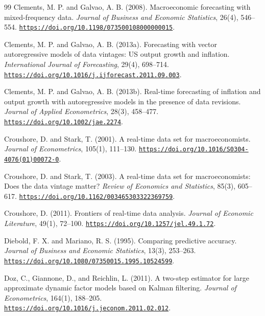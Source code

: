 \documentclass[12pt]{article}
\begin{document}
\begin{thebibliography}{99}
Clements, M. P. and Galvao, A. B. (2008).
Macroeconomic forecasting with mixed-frequency data.
\emph{Journal of Business and Economic Statistics}, 26(4), 546--554. \href{https://doi.org/10.1198/073500108000000015}{\nolinkurl{https://doi.org/10.1198/073500108000000015}}.

Clements, M. P. and Galvao, A. B. (2013a).
Forecasting with vector autoregressive models of data vintages: US output growth and inflation.
\emph{International Journal of Forecasting}, 29(4), 698--714. \href{https://doi.org/10.1016/j.ijforecast.2011.09.003}{\nolinkurl{https://doi.org/10.1016/j.ijforecast.2011.09.003}}.

Clements, M. P. and Galvao, A. B. (2013b).
Real-time forecasting of inflation and output growth with autoregressive models in the presence of data revisions.
\emph{Journal of Applied Econometrics}, 28(3), 458--477. \href{https://doi.org/10.1002/jae.2274}{\nolinkurl{https://doi.org/10.1002/jae.2274}}.

Croushore, D. and Stark, T. (2001).
A real-time data set for macroeconomists.
\emph{Journal of Econometrics}, 105(1), 111--130. \href{https://doi.org/10.1016/S0304-4076(01)00072-0}{\nolinkurl{https://doi.org/10.1016/S0304-4076(01)00072-0}}.

Croushore, D. and Stark, T. (2003).
A real-time data set for macroeconomists: Does the data vintage matter?
\emph{Review of Economics and Statistics}, 85(3), 605--617. \href{https://doi.org/10.1162/003465303322369759}{\nolinkurl{https://doi.org/10.1162/003465303322369759}}.

Croushore, D. (2011).
Frontiers of real-time data analysis.
\emph{Journal of Economic Literature}, 49(1), 72--100. \href{https://doi.org/10.1257/jel.49.1.72}{\nolinkurl{https://doi.org/10.1257/jel.49.1.72}}.

Diebold, F. X. and Mariano, R. S. (1995).
Comparing predictive accuracy.
\emph{Journal of Business and Economic Statistics}, 13(3), 253--263. \href{https://doi.org/10.1080/07350015.1995.10524599}{\nolinkurl{https://doi.org/10.1080/07350015.1995.10524599}}.

Doz, C., Giannone, D., and Reichlin, L. (2011).
A two-step estimator for large approximate dynamic factor models based on Kalman filtering.
\emph{Journal of Econometrics}, 164(1), 188--205. \href{https://doi.org/10.1016/j.jeconom.2011.02.012}{\nolinkurl{https://doi.org/10.1016/j.jeconom.2011.02.012}}.


\end{thebibliography}
\end{document}
